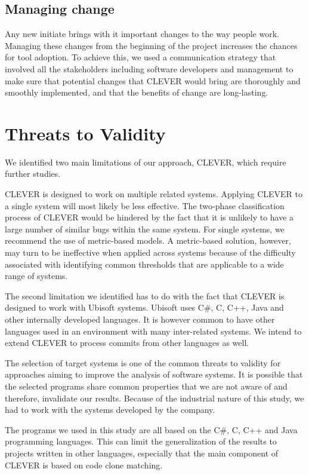 \documentclass[12pt]{report}
\begin{document}
\subsection{Managing change}\label{managing-change}

Any new initiate brings with it important changes to the way people
work. Managing these changes from the beginning of the project increases
the chances for tool adoption. To achieve this, we used a communication
strategy that involved all the stakeholders including software
developers and management to make sure that potential changes that
CLEVER would bring are thoroughly and smoothly implemented, and that the
benefits of change are long-lasting.

\section{Threats to Validity}\label{threats-to-validity-3}

We identified two main limitations of our approach, CLEVER, which
require further studies.

CLEVER is designed to work on multiple related systems. Applying CLEVER
to a single system will most likely be less effective. The two-phase
classification process of CLEVER would be hindered by the fact that it
is unlikely to have a large number of similar bugs within the same
system. For single systems, we recommend the use of metric-based models.
A metric-based solution, however, may turn to be ineffective when
applied across systems because of the difficulty associated with
identifying common thresholds that are applicable to a wide range of
systems.

The second limitation we identified has to do with the fact that CLEVER
is designed to work with Ubisoft systems. Ubisoft uses C\#, C, C++, Java
and other internally developed languages. It is however common to have
other languages used in an environment with many inter-related systems.
We intend to extend CLEVER to process commits from other languages as
well.

The selection of target systems is one of the common threats to validity
for approaches aiming to improve the analysis of software systems. It is
possible that the selected programs share common properties that we are
not aware of and therefore, invalidate our results. Because of the
industrial nature of this study, we had to work with the systems
developed by the company.

The programs we used in this study are all based on the C\#, C, C++ and
Java programming languages. This can limit the generalization of the
results to projects written in other languages, especially that the main
component of CLEVER is based on code clone matching.
\end{document}
